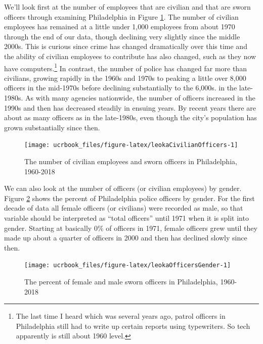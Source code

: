 \documentclass[
  12pt,
  openany]{book}
\begin{document}
We'll look first at the number of employees that are civilian and that are sworn officers through examining Philadelphia in Figure \ref{fig:leokaCivilianOfficers}. The number of civilian employees has remained at a little under 1,000 employees from about 1970 through the end of our data, though declining very slightly since the middle 2000s. This is curious since crime has changed dramatically over this time and the ability of civilian employees to contribute has also changed, such as they now have computers.\footnote{The last time I heard which was several years ago, patrol officers in Philadelphia still had to write up certain reports using typewriters. So tech apparently is still about 1960 level.} In contrast, the number of police has changed far more than civilians, growing rapidly in the 1960s and 1970s to peaking a little over 8,000 officers in the mid-1970s before declining substantially to the 6,000s. in the late-1980s. As with many agencies nationwide, the number of officers increased in the 1990s and then has decreased steadily in ensuing years. By recent years there are about as many officers as in the late-1980s, even though the city's population has grown substantially since then.

\begin{figure}

{\centering \texttt{[image: ucrbook\_files/figure-latex/leokaCivilianOfficers-1]} 

}

\caption{The number of civilian employees and sworn officers in Philadelphia, 1960-2018}\label{fig:leokaCivilianOfficers}
\end{figure}

We can also look at the number of officers (or civilian employees) by gender. Figure \ref{fig:leokaOfficersGender} shows the percent of Philadelphia police officers by gender. For the first decade of data all female officers (or civilians) were recorded as male, so that variable should be interpreted as ``total officers'' until 1971 when it is split into gender. Starting at basically 0\% of officers in 1971, female officers grew until they made up about a quarter of officers in 2000 and then has declined slowly since then.

\begin{figure}

{\centering \texttt{[image: ucrbook\_files/figure-latex/leokaOfficersGender-1]} 

}

\caption{The percent of female and male sworn officers in Philadelphia, 1960-2018}\label{fig:leokaOfficersGender}
\end{figure}
\end{document}
